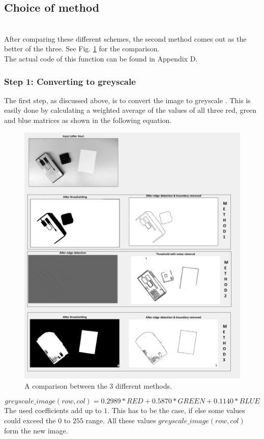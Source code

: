 \documentclass{article}
\begin{document}
\subsection{Choice of method}\mbox{}\\
After comparing these different schemes, the second method comes out as the better of the three. See Fig. \ref{fig:comparison_methods} for the comparison.\\ The actual code of this function can be found in Appendix D. 
\subsubsection{Step 1: Converting to greyscale}
The first step, as discussed above, is to convert the image to greyscale \cite{greyscale}. This is easily done by calculating a weighted average of the values of all three red, green and blue matrices as shown in the following equation.
\begin{figure}[h]
\center
\includegraphics[width=0.7\linewidth]{comparison_methods.png}
\caption{A comparison between the 3 different methods.}
\label{fig:comparison_methods}
\end{figure}
\begin{equation}
greyscale\_image(row, col) = 0.2989 * RED + 0.5870 * GREEN + 0.1140 * BLUE
\end{equation}
The used coefficients add up to $1$. This has to be the case, if else some values could exceed the $0$ to $255$ range. All these values $greyscale\_image(row, col)$ form the new image.
\end{document}
